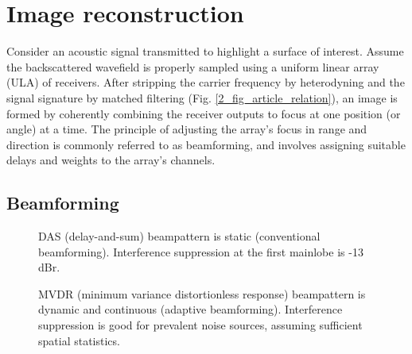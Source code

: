 {\section{Image reconstruction}\label{methods}

Consider an acoustic signal transmitted to highlight a surface of interest. Assume the backscattered wavefield is properly sampled using a uniform linear array (ULA) of receivers. After stripping the carrier frequency by heterodyning and the signal signature by matched filtering (Fig. \ref{2_fig_article_relation}), an image is formed by coherently combining the receiver outputs to focus at one position (or angle) at a time. The principle of adjusting the array's focus in range and direction is commonly referred to as beamforming, and involves assigning suitable delays and weights to the array's channels.



\subsection{Beamforming}

\begin{figure}[tp]
\caption{DAS (delay-and-sum) beampattern is static (conventional beamforming). Interference suppression at the first mainlobe is -13\,dBr.}%
\label{2_fig_scenario_das}
\end{figure}

\begin{figure}[tp]
\caption{MVDR (minimum variance distortionless response) beampattern is dynamic and continuous (adaptive beamforming). Interference suppression is good for prevalent noise sources, assuming sufficient spatial statistics.}%
\label{2_fig_scenario_mvdr}
\end{figure}

}
